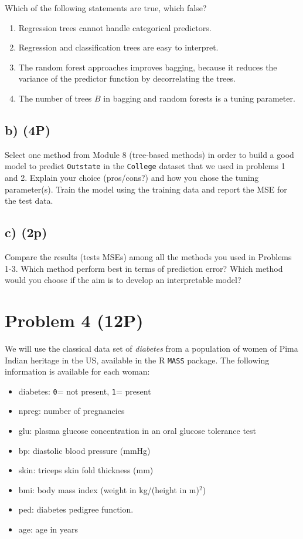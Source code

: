\documentclass[]{article}
\providecommand{\tightlist}{%
  \setlength{\itemsep}{0pt}\setlength{\parskip}{0pt}}
\begin{document}
Which of the following statements are true, which false?

\begin{enumerate}
\def\labelenumi{(\roman{enumi})}
\tightlist
\item
  Regression trees cannot handle categorical predictors.
\item
  Regression and classification trees are easy to interpret.
\item
  The random forest approaches improves bagging, because it reduces the
  variance of the predictor function by decorrelating the trees.
\item
  The number of trees \(B\) in bagging and random forests is a tuning
  parameter.
\end{enumerate}

\hypertarget{b-4p}{%
\subsection{b) (4P)}\label{b-4p}}

Select one method from Module 8 (tree-based methods) in order to build a
good model to predict \texttt{Outstate} in the \texttt{College} dataset
that we used in problems 1 and 2. Explain your choice (pros/cons?) and
how you chose the tuning parameter(s). Train the model using the
training data and report the MSE for the test data.

\hypertarget{c-2p-1}{%
\subsection{c) (2p)}\label{c-2p-1}}

Compare the results (tests MSEs) among all the methods you used in
Problems 1-3. Which method perform best in terms of prediction error?
Which method would you choose if the aim is to develop an interpretable
model?

\hypertarget{problem-4-12p}{%
\section{Problem 4 (12P)}\label{problem-4-12p}}

We will use the classical data set of \emph{diabetes} from a population
of women of Pima Indian heritage in the US, available in the R
\texttt{MASS} package. The following information is available for each
woman:

\begin{itemize}
\tightlist
\item
  diabetes: \texttt{0}= not present, \texttt{1}= present
\item
  npreg: number of pregnancies
\item
  glu: plasma glucose concentration in an oral glucose tolerance test
\item
  bp: diastolic blood pressure (mmHg)
\item
  skin: triceps skin fold thickness (mm)
\item
  bmi: body mass index (weight in kg/(height in m)\(^2\))
\item
  ped: diabetes pedigree function.
\item
  age: age in years
\end{itemize}
\end{document}
